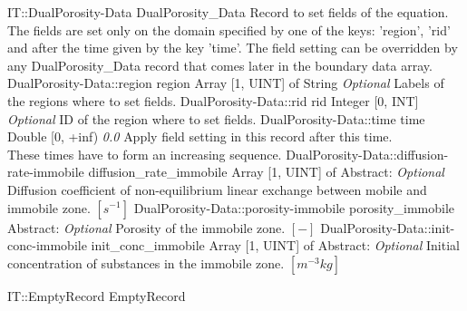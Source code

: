 \begin{RecordType}
	{IT::DualPorosity-Data}
	{DualPorosity{\_}Data}
	{} %
	{} %
	{{{Record to set fields of the equation.}\\{
The fields are set only on the domain specified by one of the keys: 'region', 'rid'}\\{
and after the time given by the key 'time'. The field setting can be overridden by}\\{
 any DualPorosity{\_}Data record that comes later in the boundary data array.}}}
		\RecKey
			{DualPorosity-Data::region}
			{region}
			{{Array [1, UINT] of }{String}}
			{ \it{Optional} }
			{{{Labels of the regions where to set fields. }}}
		\RecKey
			{DualPorosity-Data::rid}
			{rid}
			{{Integer [0, INT]}}
			{ \it{Optional} }
			{{{ID of the region where to set fields.}}}
		\RecKey
			{DualPorosity-Data::time}
			{time}
			{{Double [0, +inf)}}
			{ \it{0.0} }
			{{{Apply field setting in this record after this time.}\\{
These times have to form an increasing sequence.}}}
		\RecKey
			{DualPorosity-Data::diffusion-rate-immobile}
			{diffusion{\_}rate{\_}immobile}
			{{Array [1, UINT] of }{Abstract}{: }}
			{ \it{Optional} }
			{{{Diffusion coefficient of non-equilibrium linear exchange between mobile and immobile zone. }{$[s^{-1}]$}}}
		\RecKey
			{DualPorosity-Data::porosity-immobile}
			{porosity{\_}immobile}
			{{Abstract}{: }}
			{ \it{Optional} }
			{{{Porosity of the immobile zone. }{$[-]$}}}
		\RecKey
			{DualPorosity-Data::init-conc-immobile}
			{init{\_}conc{\_}immobile}
			{{Array [1, UINT] of }{Abstract}{: }}
			{ \it{Optional} }
			{{{Initial concentration of substances in the immobile zone. }{$[m^{-3}kg]$}}}
\end{RecordType}
\begin{RecordType}
	{IT::EmptyRecord}
	{EmptyRecord}
	{} %
	{} %
	{}
\end{RecordType}

